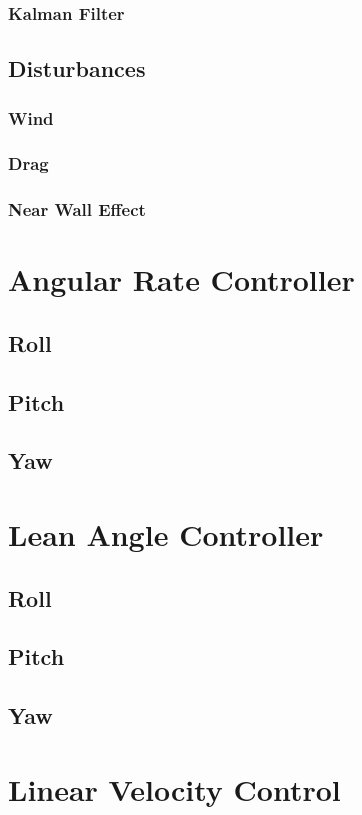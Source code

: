 			\subsubsection{Kalman Filter}
		
		\subsection{Disturbances}
			\subsubsection{Wind}
			\subsubsection{Drag}
			\subsubsection{Near Wall Effect}
	
	\section{Angular Rate Controller}
		\subsection{Roll}
		\subsection{Pitch}
		\subsection{Yaw}	

	\section{Lean Angle Controller}
		\subsection{Roll}
		\subsection{Pitch}
		\subsection{Yaw}			
	
	\section{Linear Velocity Control}
	
